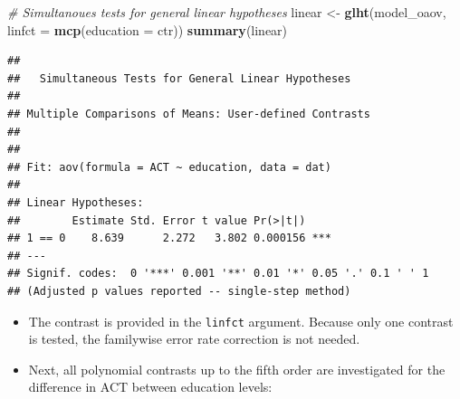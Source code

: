 \documentclass[
]{book}
\newenvironment{Shaded}{\begin{snugshade}}{\end{snugshade}}
\newcommand{\AttributeTok}[1]{\textcolor[rgb]{0.13,0.29,0.53}{#1}}
\newcommand{\CommentTok}[1]{\textcolor[rgb]{0.56,0.35,0.01}{\textit{#1}}}
\newcommand{\FunctionTok}[1]{\textcolor[rgb]{0.13,0.29,0.53}{\textbf{#1}}}
\newcommand{\NormalTok}[1]{#1}
\newcommand{\OtherTok}[1]{\textcolor[rgb]{0.56,0.35,0.01}{#1}}
\begin{document}
\begin{Shaded}
\begin{Highlighting}[]
\CommentTok{\# Simultanoues tests for general linear hypotheses}
\NormalTok{linear }\OtherTok{\textless{}{-}} \FunctionTok{glht}\NormalTok{(model\_oaov, }\AttributeTok{linfct =} \FunctionTok{mcp}\NormalTok{(}\AttributeTok{education =}\NormalTok{ ctr))}
\FunctionTok{summary}\NormalTok{(linear)}
\end{Highlighting}
\end{Shaded}

\begin{verbatim}
## 
##   Simultaneous Tests for General Linear Hypotheses
## 
## Multiple Comparisons of Means: User-defined Contrasts
## 
## 
## Fit: aov(formula = ACT ~ education, data = dat)
## 
## Linear Hypotheses:
##        Estimate Std. Error t value Pr(>|t|)    
## 1 == 0    8.639      2.272   3.802 0.000156 ***
## ---
## Signif. codes:  0 '***' 0.001 '**' 0.01 '*' 0.05 '.' 0.1 ' ' 1
## (Adjusted p values reported -- single-step method)
\end{verbatim}

\begin{itemize}
\item
  The contrast is provided in the \texttt{linfct} argument. Because only one contrast is tested, the familywise error rate correction is not needed.
\item
  Next, all polynomial contrasts up to the fifth order are investigated for the difference in ACT between education levels:
\end{itemize}
\end{document}
